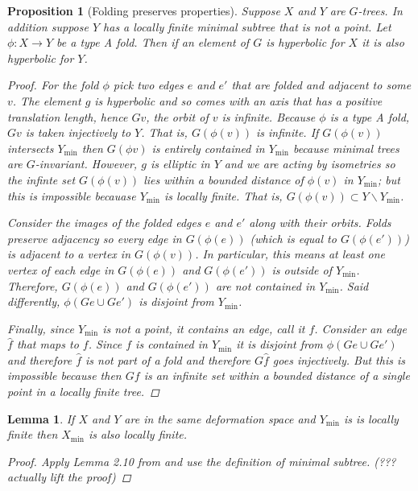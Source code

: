 \documentclass[12pt,parskip=full]{report}
\theoremstyle{plain}
\newtheorem{lem}[thm]{Lemma}
\newtheorem{prop}[thm]{Proposition}
\theoremstyle{definition}
\begin{document}
\begin{prop}
    [Folding preserves properties]
    \label{lem:foldingpreserveshyp}
    Suppose $X$ and $Y$ are $G$-trees. In addition suppose $Y$ has a locally finite minimal subtree that is not a point. Let $\phi:X\to Y$ be a type A fold. Then if an element of $G$ is hyperbolic for $X$ it is also hyperbolic for $Y$.
    
    \begin{proof}
        For the fold $\phi$ pick two edges $e$ and $e'$ that are folded and adjacent to some $v$. The element $g$ is hyperbolic and so comes with an axis that has a positive translation length, hence $Gv$, the orbit of $v$ is infinite. Because $\phi$ is a type A fold, $G v$ is taken injectively to $Y$. That is, $G(\phi (v))$ is infinite. If $G(\phi (v))$ intersects $Y_\text{min}$ then $G(\phi v)$ is entirely contained in $Y_\text{min}$ because minimal trees are $G$-invariant. However, $g$ is elliptic in $Y$ and we are acting by isometries so the infinte set $G(\phi (v))$ lies within a bounded distance of $\phi (v)$ in $Y_\text{min}$; but this is impossible becauase $Y_\text{min}$ is locally finite. That is, $G(\phi (v))\subset Y\smallsetminus Y_\text{min}$. 
        
        Consider the images of the folded edges $e$ and $e'$ along with their orbits. 
        Folds preserve adjacency so every edge in $G(\phi (e))$ (which is equal to $G(\phi (e'))$) is adjacent to a vertex in $G( \phi (v))$. In particular, this means at least one vertex of each edge in $G(\phi (e))$ and $G(\phi (e'))$ is outside of $Y_\text{min}$. 
        Therefore, $G(\phi (e))$ and $G(\phi (e'))$ are not contained in $Y_\text{min}$. 
        Said differently, $\phi( Ge\cup Ge')$ is disjoint from $Y_\text{min}$.
        
        Finally, since $Y_\text{min}$ is not a point, it contains an edge, call it $f$. Consider an edge $\hat{f}$ that maps to $f$. Since $f$ is contained in $Y_\text{min}$ it is disjoint from $\phi( Ge\cup Ge')$ and therefore $\hat{f}$ is not part of a fold and therefore \(G\hat{f}\) goes injectively. But this is impossible because then $Gf$ is an infinite set within a bounded distance of a single point in a locally finite tree.
    \end{proof}
\end{prop}

\begin{lem}
    \label{lem:pullbacklocallyfinite}
    If \(X\) and \(Y\) are in the same deformation space and \(Y_\text{min}\) is is locally finite then \(X_\text{min}\) is also locally finite.
    \begin{proof}
        Apply Lemma 2.10 from \cite{draftpaper} and use the definition of minimal subtree. (??? actually lift the proof)
    \end{proof}
\end{lem}
\end{document}
